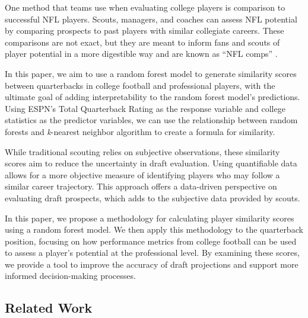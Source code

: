 \documentclass{article}
\begin{document}
One method that teams use when evaluating college players is comparison to successful NFL players. Scouts, managers, and coaches can assess NFL potential by comparing prospects to past players with similar collegiate careers. These comparisons are not exact, but they are meant to inform fans and scouts of player potential in a more digestible way and are known as ``NFL comps'' \citep{jones_nfl_2025}.

In this paper, we aim to use a random forest model to generate similarity scores between quarterbacks in college football and professional players, with the ultimate goal of adding interpretability to the random forest model's predictions. Using ESPN's Total Quarterback Rating as the response variable and college statistics as the predictor variables, we can use the relationship between random forests and \textit{k}-nearest neighbor algorithm \citep{lin_random_2006} to create a formula for similarity.

While traditional scouting relies on subjective observations, these similarity scores aim to reduce the uncertainty in draft evaluation. Using quantifiable data allows for a more objective measure of identifying players who may follow a similar career trajectory. This approach offers a data-driven perspective on evaluating draft prospects, which adds to the subjective data provided by scouts.

In this paper, we propose a methodology for calculating player similarity scores using a random forest model. We then apply this methodology to the quarterback position, focusing on how performance metrics from college football can be used to assess a player's potential at the professional level. By examining these scores, we provide a tool to improve the accuracy of draft projections and support more informed decision-making processes.

\subsection{Related Work}
\end{document}
